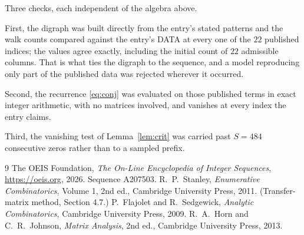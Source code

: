 \documentclass[11pt,a4paper]{article}
\theoremstyle{plain}
\theoremstyle{definition}
\begin{document}
Three checks, each independent of the algebra above.

First, the digraph was built directly from the entry's stated patterns and the walk counts
compared against the entry's DATA at every one of the $22$ published indices; the
values agree exactly, including the initial count of $22$ admissible columns. That is
what ties the digraph to the sequence, and a model reproducing only part of the published
data was rejected wherever it occurred.

Second, the recurrence \eqref{eq:conj} was evaluated on those published terms in exact
integer arithmetic, with no matrices involved, and vanishes at every index the entry claims.

Third, the vanishing test of Lemma~\ref{lem:crit} was carried past $S=484$ consecutive
zeros rather than to a sampled prefix.

\begin{thebibliography}{9}
 The OEIS Foundation, \emph{The On-Line Encyclopedia of Integer
Sequences}, \url{https://oeis.org}, 2026. Sequence A207503.
 R.~P.~Stanley, \emph{Enumerative Combinatorics}, Volume 1, 2nd ed.,
Cambridge University Press, 2011. (Transfer-matrix method, Section 4.7.)
 P.~Flajolet and R.~Sedgewick, \emph{Analytic Combinatorics}, Cambridge
University Press, 2009.
 R.~A.~Horn and C.~R.~Johnson, \emph{Matrix Analysis}, 2nd ed., Cambridge
University Press, 2013.
\end{thebibliography}
\end{document}
